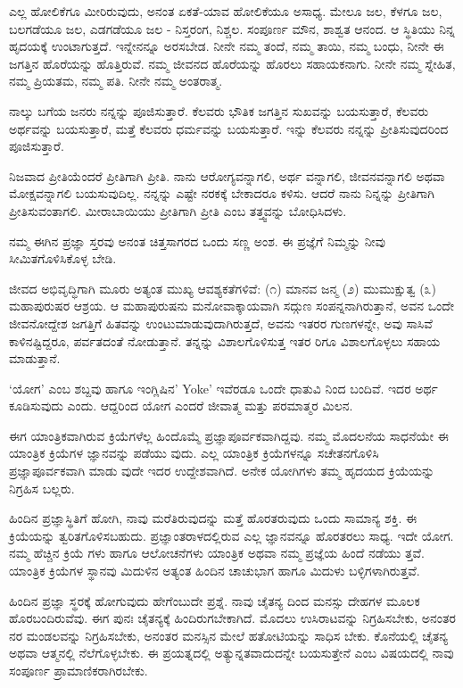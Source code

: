 ಎಲ್ಲ ಹೋಲಿಕೆಗೂ ಮೀರಿರುವುದು, ಅನಂತ ಏಕತೆ-ಯಾವ ಹೋಲಿಕೆಯೂ ಅಸಾಧ್ಯ. ಮೇಲೂ ಜಲ, ಕೆಳಗೂ ಜಲ, ಬಲಗಡೆಯೂ ಜಲ, ಎಡಗಡೆಯೂ ಜಲ - ನಿಸ್ತರಂಗ, ನಿಶ್ಚಲ. ಸಂಪೂರ್ಣ ಮೌನ, ಶಾಶ್ವತ ಆನಂದ. ಆ ಸ್ಥಿತಿಯು ನಿನ್ನ ಹೃದಯಕ್ಕೆ ಉಂಟಾಗುತ್ತದೆ. ಇನ್ನೇನನ್ನೂ ಅರಸಬೇಡ. ನೀನೇ ನಮ್ಮ ತಂದೆ, ನಮ್ಮ ತಾಯಿ, ನಮ್ಮ ಬಂಧು, ನೀನೇ ಈ ಜಗತ್ತಿನ ಹೊರೆಯನ್ನು ಹೊತ್ತಿರುವೆ. ನಮ್ಮ ಜೀವನದ ಹೊರೆಯನ್ನು ಹೊರಲು ಸಹಾಯಕನಾಗು. ನೀನೇ ನಮ್ಮ ಸ್ನೇಹಿತ, ನಮ್ಮ ಪ್ರಿಯತಮ, ನಮ್ಮ ಪತಿ. ನೀನೇ ನಮ್ಮ ಅಂತರಾತ್ಮ.

ನಾಲ್ಕು ಬಗೆಯ ಜನರು ನನ್ನನ್ನು ಪೂಜಿಸುತ್ತಾರೆ. ಕೆಲವರು ಭೌತಿಕ ಜಗತ್ತಿನ ಸುಖವನ್ನು ಬಯಸುತ್ತಾರೆ, ಕೆಲವರು ಅರ್ಥವನ್ನು ಬಯಸುತ್ತಾರೆ, ಮತ್ತೆ ಕೆಲವರು ಧರ್ಮವನ್ನು ಬಯಸುತ್ತಾರೆ. ಇನ್ನು ಕೆಲವರು ನನ್ನನ್ನು ಪ್ರೀತಿಸುವುದರಿಂದ ಪೂಜಿಸುತ್ತಾರೆ.

ನಿಜವಾದ ಪ್ರೀತಿಯೆಂದರೆ ಪ್ರೀತಿಗಾಗಿ ಪ್ರೀತಿ. ನಾನು ಆರೋಗ್ಯವನ್ನಾಗಲಿ, ಅರ್ಥ ವನ್ನಾಗಲಿ, ಜೀವನವನ್ನಾಗಲಿ ಅಥವಾ ಮೋಕ್ಷವನ್ನಾಗಲಿ ಬಯಸುವುದಿಲ್ಲ. ನನ್ನನ್ನು ಎಷ್ಟೇ ನರಕಕ್ಕೆ ಬೇಕಾದರೂ ಕಳಿಸು. ಆದರೆ ನಾನು ನಿನ್ನನ್ನು ಪ್ರೀತಿಗಾಗಿ ಪ್ರೀತಿಸುವಂತಾಗಲಿ. ಮೀರಾಬಾಯಿಯು ಪ್ರೀತಿಗಾಗಿ ಪ್ರೀತಿ ಎಂಬ ತತ್ತ್ವವನ್ನು ಬೋಧಿಸಿದಳು.

ನಮ್ಮ ಈಗಿನ ಪ್ರಜ್ಞಾ ಸ್ತರವು ಅನಂತ ಚಿತ್ತಸಾಗರದ ಒಂದು ಸಣ್ಣ ಅಂಶ. ಈ ಪ್ರಜ್ಞೆಗೆ ನಿಮ್ಮನ್ನು ನೀವು ಸೀಮಿತಗೊಳಿಸಿಕೊಳ್ಳ ಬೇಡಿ.

ಜೀವದ ಅಭಿವೃದ್ಧಿಗಾಗಿ ಮೂರು ಅತ್ಯಂತ ಮುಖ್ಯ ಆವಶ್ಯಕತೆಗಳಿವೆ: (೧) ಮಾನವ ಜನ್ಮ (೨) ಮುಮುಕ್ಷುತ್ವ (೩) ಮಹಾಪುರುಷರ ಆಶ್ರಯ. ಆ ಮಹಾಪುರುಷನು ಮನೋವಾಕ್ಕಾಯವಾಗಿ ಸದ್ಗುಣ ಸಂಪನ್ನನಾಗಿರುತ್ತಾನೆ, ಅವನ ಒಂದೇ ಜೀವನೋದ್ದೇಶ ಜಗತ್ತಿಗೆ ಹಿತವನ್ನು ಉಂಟುಮಾಡುವುದಾಗಿರುತ್ತದೆ, ಅವನು ಇತರರ ಗುಣಗಳನ್ನೇ, ಅವು ಸಾಸಿವೆ ಕಾಳಿನಷ್ಟಿದ್ದರೂ, ಪರ್ವತದಂತೆ ನೋಡುತ್ತಾನೆ. ತನ್ನನ್ನು ವಿಶಾಲಗೊಳಿಸುತ್ತ ಇತರ ರಿಗೂ ವಿಶಾಲಗೊಳ್ಳಲು ಸಹಾಯ ಮಾಡುತ್ತಾನೆ.

‘ಯೋಗ’ ಎಂಬ ಶಬ್ದವು ಹಾಗೂ ಇಂಗ್ಲಿಷಿನ’ Yoke’ ಇವೆರಡೂ ಒಂದೇ ಧಾತುವಿ ನಿಂದ ಬಂದಿವೆ. ಇದರ ಅರ್ಥ ಕೂಡಿಸುವುದು ಎಂದು. ಆದ್ದರಿಂದ ಯೋಗ ಎಂದರೆ ಜೀವಾತ್ಮ ಮತ್ತು ಪರಮಾತ್ಮರ ಮಿಲನ.

ಈಗ ಯಾಂತ್ರಿಕವಾಗಿರುವ ಕ್ರಿಯೆಗಳೆಲ್ಲ ಹಿಂದೊಮ್ಮೆ ಪ್ರಜ್ಞಾಪೂರ್ವಕವಾಗಿದ್ದವು. ನಮ್ಮ ಮೊದಲನೆಯ ಸಾಧನೆಯೇ ಈ ಯಾಂತ್ರಿಕ ಕ್ರಿಯೆಗಳ ಜ್ಞಾನವನ್ನು ಪಡೆಯು ವುದು. ಎಲ್ಲ ಯಾಂತ್ರಿಕ ಕ್ರಿಯೆಗಳನ್ನೂ ಸಚೇತನಗೊಳಿಸಿ ಪ್ರಜ್ಞಾಪೂರ್ವಕವಾಗಿ ಮಾಡು ವುದೇ ಇದರ ಉದ್ದೇಶವಾಗಿದೆ. ಅನೇಕ ಯೋಗಿಗಳು ತಮ್ಮ ಹೃದಯದ ಕ್ರಿಯೆಯನ್ನು ನಿಗ್ರಹಿಸ ಬಲ್ಲರು.

ಹಿಂದಿನ ಪ್ರಜ್ಞಾಸ್ಥಿತಿಗೆ ಹೋಗಿ, ನಾವು ಮರೆತಿರುವುದನ್ನು ಮತ್ತೆ ಹೊರತರುವುದು ಒಂದು ಸಾಮಾನ್ಯ ಶಕ್ತಿ. ಈ ಕ್ರಿಯೆಯನ್ನು ತ್ವರಿತಗೊಳಿಸಬಹುದು. ಪ್ರಜ್ಞಾಂತರಾಳದಲ್ಲಿರುವ ಎಲ್ಲ ಜ್ಞಾನವನ್ನೂ ಹೊರತರಲು ಸಾಧ್ಯ. ಇದೇ ಯೋಗ. ನಮ್ಮ ಹೆಚ್ಚಿನ ಕ್ರಿಯೆ ಗಳು ಹಾಗೂ ಆಲೋಚನೆಗಳು ಯಾಂತ್ರಿಕ ಅಥವಾ ನಮ್ಮ ಪ್ರಜ್ಞೆಯ ಹಿಂದೆ ನಡೆಯು ತ್ತವೆ. ಯಾಂತ್ರಿಕ ಕ್ರಿಯೆಗಳ ಸ್ಥಾನವು ಮಿದುಳಿನ ಅತ್ಯಂತ ಹಿಂದಿನ ಚಾಚುಭಾಗ  ಹಾಗೂ ಮಿದುಳು ಬಳ್ಳಿಗಳಾಗಿರುತ್ತವೆ.

ಹಿಂದಿನ ಪ್ರಜ್ಞಾ ಸ್ಥರಕ್ಕೆ ಹೋಗುವುದು ಹೇಗೆಂಬುದೇ ಪ್ರಶ್ನೆ. ನಾವು ಚೈತನ್ಯ ದಿಂದ ಮನಸ್ಸು ದೇಹಗಳ ಮೂಲಕ ಹೊರಬಂದಿರುವೆವು. ಈಗ ಪುನಃ ಚೈತನ್ಯಕ್ಕೆ ಹಿಂದಿರುಗಬೇಕಾಗಿದೆ. ಮೊದಲು ಉಸಿರಾಟವನ್ನು ನಿಗ್ರಹಿಸಬೇಕು, ಅನಂತರ ನರ ಮಂಡಲವನ್ನು ನಿಗ್ರಹಿಸಬೇಕು, ಅನಂತರ ಮನಸ್ಸಿನ ಮೇಲೆ ಹತೋಟಿಯನ್ನು ಸಾಧಿಸ ಬೇಕು. ಕೊನೆಯಲ್ಲಿ ಚೈತನ್ಯ ಅಥವಾ ಆತ್ಮನಲ್ಲಿ ನೆಲೆಗೊಳ್ಳಬೇಕು. ಈ ಪ್ರಯತ್ನದಲ್ಲಿ ಅತ್ಯುನ್ನತವಾದುದನ್ನೇ ಬಯಸುತ್ತೇನೆ ಎಂಬ ವಿಷಯದಲ್ಲಿ ನಾವು ಸಂಪೂರ್ಣ ಪ್ರಾಮಾಣಿಕರಾಗಿರಬೇಕು.

